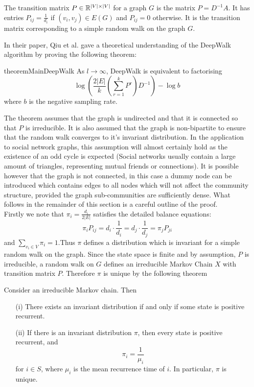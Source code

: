 \documentclass[a4paper]{article}
\begin{document}
\begin{definition}
  The transition matrix $P \in \R^{|V| \times |V|}$ for a graph $G$ is the
  matrix $P = D^{-1}A$. It has entries $P_{ij} = \frac{1}{d_i}$ if $(v_i, v_j)
  \in E(G)$ and $P_{ij} = 0$ otherwise. It is the transition matrix
  corresponding to a simple random walk on the graph $G$. 
\end{definition}
In their paper, Qiu et al. gave a theoretical understanding of the DeepWalk
algorithm by proving the following theorem:
\begin{restatable}{theorem}{MainDeepWalk}
  As $l \to \infty$, DeepWalk is equivalent to factorising
  \[\log{\left(\frac{2|E|}{k}\left( \sum_{r = 1}^k P^r  \right) D^{-1}
      \right)} - \log{b}\]
  where $b$ is the negative sampling rate.
\end{restatable}
\noindent The theorem assumes that the graph is undirected and that it is connected so
that $P$ is irreducible. It is also assumed that the graph is
non-bipartite to ensure that the random walk converges to it's invariant distribution. In the application to
social network graphs, this
assumption will almost certainly hold as the existence of an odd cycle is
expected (Social networks usually contain a large amount of triangles,
representing mutual friends or connections). It is possible however that the
graph is not connected, in this case a dummy node can be introduced which
contains edges to all nodes which will not affect the community structure,
provided the graph sub-communities are sufficiently dense.
What follows in the remainder of this section is a careful outline of the proof.\\
Firstly we note that $\pi_i = \frac{d_i}{2|E|}$ satisfies the detailed balance equations:
\[\pi_i P_{ij} = d_i\cdot \frac{1}{d_i} = d_j \cdot \frac{1}{d_j} = \pi_j P_{ji}\]
and $\sum_{v_i \in V} \pi_i = 1$.Thus $\pi$ defines a distribution which is
invariant for a simple random walk on the graph. Since the state space is
finite and by assumption, $P$ is irreducible, a random walk on $G$ defines an
irreducible Markov Chain $X$ with transition matrix $P$. Therefore $\pi$ is
unique by the following theorem
\begin{theorem}
  Consider an irreducible Markov chain. Then
  \begin{itemize}
  \item[(i)] There exists an invariant distribution if and only if some state is
    positive recurrent.
  \item[(ii)] If there is an invariant distribution $\pi$, then every state is
    positive recurrent, and
    \[\pi_i = \frac{1}{\mu_i}\]
    for $i \in S$, where $\mu_i$ is the mean recurrence time of $i$. In
    particular, $\pi$ is unique.
  \end{itemize}
\end{theorem}
\end{document}
